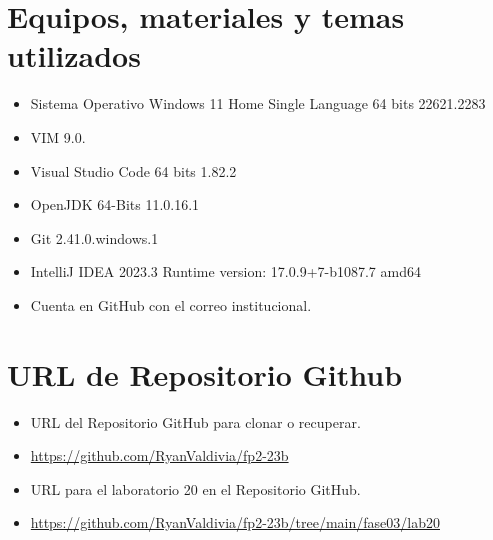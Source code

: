 \documentclass{article}
\begin{document}
	\section{Equipos, materiales y temas utilizados}
	\begin{itemize}
		\item Sistema Operativo Windows 11 Home Single Language 64 bits 22621.2283
		\item VIM 9.0.
		\item Visual Studio Code 64 bits 1.82.2
		\item OpenJDK 64-Bits 11.0.16.1
		\item Git 2.41.0.windows.1
		\item IntelliJ IDEA 2023.3 Runtime version: 17.0.9+7-b1087.7 amd64
		\item Cuenta en GitHub con el correo institucional. 
	\end{itemize}
	
	\section{URL de Repositorio Github}
	\begin{itemize}
		\item URL del Repositorio GitHub para clonar o recuperar.
		\item \url{https://github.com/RyanValdivia/fp2-23b}
		\item URL para el laboratorio 20 en el Repositorio GitHub.
		\item \url{https://github.com/RyanValdivia/fp2-23b/tree/main/fase03/lab20}
	\end{itemize}
	
\end{document}
